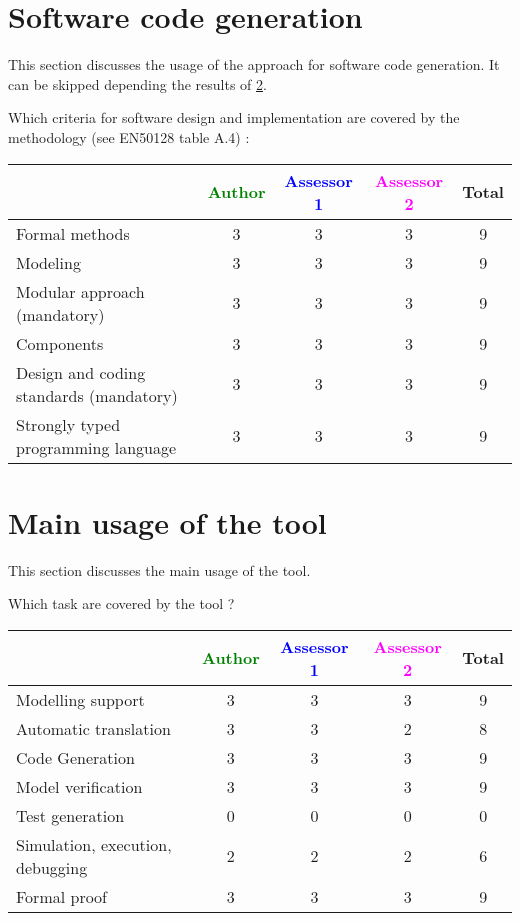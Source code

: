 \section{Software code generation}
This section discusses the usage of the approach for software code generation.
It can be skipped depending the results of \ref{main_usage}.

Which criteria for software design and implementation are covered by the methodology
(see EN50128 table A.4) :

\begin{tabular}{|l | c | c | c | c|}
\hline
& \textcolor{green}{Author} & \textcolor{blue}{Assessor 1} & \textcolor{magenta}{Assessor 2} & Total \\
\hline
Formal methods  & 3 & 3 & 3 & 9 \\
\hline 
Modeling  & 3 & 3 & 3 & 9 \\
\hline
Modular approach (mandatory) & 3 & 3 & 3 & 9 \\
\hline
Components & 3 & 3 & 3 & 9 \\
\hline
Design and coding standards (mandatory) & 3 & 3 & 3 & 9 \\
\hline
Strongly typed programming language & 3 & 3 & 3 & 9 \\
\hline

\end{tabular}



\section{Main usage of the tool}
\label{main_usage}

This section discusses the main usage of the tool.

Which task are covered by the tool ?


\begin{tabular}{|l | c | c | c | c|}
\hline
& \textcolor{green}{Author} & \textcolor{blue}{Assessor 1} & \textcolor{magenta}{Assessor 2} & Total \\
\hline 
Modelling support & 3 & 3 & 3 & 9 \\
\hline
Automatic translation  & 3 & 3 & 2 & 8 \\
\hline
Code Generation  & 3 & 3 & 3 & 9 \\
\hline
Model verification & 3 & 3 & 3  & 9 \\
\hline
Test generation & 0 & 0 & 0& 0 \\
\hline
Simulation, execution, debugging & 2  & 2 & 2 & 6\\
\hline
Formal proof & 3 & 3 & 3 & 9 \\
\hline
\end{tabular}

